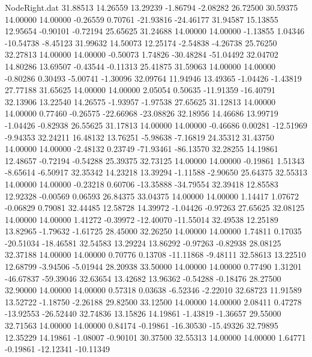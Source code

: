 \begin{filecontents}{NodeRight.dat}
  31.88513   14.26559   13.29239    -1.86794   -2.08282   26.72500   30.59375   14.00000   14.00000   -0.26559    0.70761  -21.93816  -24.46177
  31.94587   15.13855   12.95654    -0.90101   -0.72194   25.65625   31.24688   14.00000   14.00000   -1.13855    1.04346  -10.54738   -8.45123
  31.99632   14.50073   12.25174    -2.54838   -4.26738   25.76250   32.27813   14.00000   14.00000   -0.50073    1.74826  -30.48284  -51.04492
  32.04702   14.80286   13.69507    -0.43544   -0.11313   25.41875   31.59063   14.00000   14.00000   -0.80286    0.30493   -5.00741   -1.30096
  32.09764   11.94946   13.49365    -1.04426   -1.43819   27.77188   31.65625   14.00000   14.00000    2.05054    0.50635  -11.91359  -16.40791
  32.13906   13.22540   14.26575    -1.93957   -1.97538   27.65625   31.12813   14.00000   14.00000    0.77460   -0.26575  -22.66968  -23.08826
  32.18956   14.46686   13.99719    -1.04426   -0.82938   26.55625   31.17813   14.00000   14.00000   -0.46686    0.00281  -12.51969   -9.94353
  32.24211   16.48132   13.76251    -5.98638   -7.16819   24.35312   31.43750   14.00000   14.00000   -2.48132    0.23749  -71.93461  -86.13570
  32.28255   14.19861   12.48657    -0.72194   -0.54288   25.39375   32.73125   14.00000   14.00000   -0.19861    1.51343   -8.65614   -6.50917
  32.35342   14.23218   13.39294    -1.11588   -2.90650   25.64375   32.55313   14.00000   14.00000   -0.23218    0.60706  -13.35888  -34.79554
  32.39418   12.85583   12.92328    -0.00569    0.06593   26.84375   33.04375   14.00000   14.00000    1.14417    1.07672   -0.06829    0.79081
  32.44485   12.58728   14.39972    -1.04426   -0.97263   27.65625   32.08125   14.00000   14.00000    1.41272   -0.39972  -12.40070  -11.55014
  32.49538   12.25189   13.82965    -1.79632   -1.61725   28.45000   32.26250   14.00000   14.00000    1.74811    0.17035  -20.51034  -18.46581
  32.54583   13.29224   13.86292    -0.97263   -0.82938   28.08125   32.37188   14.00000   14.00000    0.70776    0.13708  -11.11868   -9.48111
  32.58613   13.22510   12.68799    -3.94506   -5.01944   28.20938   33.50000   14.00000   14.00000    0.77490    1.31201  -46.67837  -59.39046
  32.63654   13.42682   13.96362    -0.54288   -0.18476   28.27500   32.90000   14.00000   14.00000    0.57318    0.03638   -6.52346   -2.22010
  32.68723   11.91589   13.52722    -1.18750   -2.26188   29.82500   33.12500   14.00000   14.00000    2.08411    0.47278  -13.92553  -26.52440
  32.74836   13.15826   14.19861    -1.43819   -1.36657   29.55000   32.71563   14.00000   14.00000    0.84174   -0.19861  -16.30530  -15.49326
  32.79895   12.35229   14.19861    -1.08007   -0.90101   30.37500   32.55313   14.00000   14.00000    1.64771   -0.19861  -12.12341  -10.11349

\end{filecontents}
